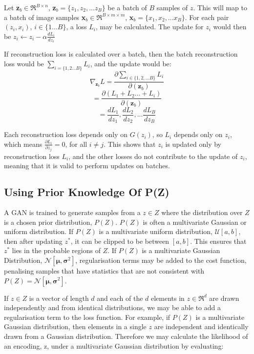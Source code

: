 \documentclass[journal]{IEEEtran}
\begin{document}
Let \textbf{z}$_b \in \Re^{B \times n}$, \textbf{z}$_b=\{z_1, z_2, ... z_B\}$ be a batch of $B$ samples of $z$. This will map to a batch of image samples \textbf{x}$_b \in \Re^{B \times m \times m}$, \textbf{x}$_b=\{x_1, x_2, ... x_B\}$. For each pair $(z_i, x_i)$, $i \in \{1...B\}$, a loss $L_i$, may be calculated. The update for $z_i$ would then be $z_i \gets z_i - \alpha \frac{d L_i}{d z_i}$ 

If reconstruction loss is calculated over a batch, then the batch reconstruction loss would be $\sum_{i=\{1,2...B\}} L_i$, and the update would be: 
\begin{equation}
    \nabla_{\textbf{z}_b} L = \frac{\partial \sum_{i \in \{1,2,...B\}} L_i}{\partial (\textbf{z}_b)}
\end{equation}
\begin{equation}
    =\frac{\partial(L_1+L_2...+L_i)}{\partial(\textbf{z}_b)}
\end{equation}
\begin{equation}
    = \frac{dL_1}{dz_1}, \frac{dL_2}{dz_2}, ... \frac{dL_B}{dz_B}
\end{equation}

Each reconstruction loss depends only on $G(z_i)$, so $L_i$ depends only on $z_i$, which means $\frac{\partial L_i}{\partial z_j}=0$, for all $i\not=j$. This shows that $z_i$ is updated only by reconstruction loss $L_i$, and the other losses do not contribute to the update of $z_i$, meaning that it is valid to perform updates on batches.


\subsection{Using Prior Knowledge Of P(Z)}

A GAN is trained to generate samples from a $z \in Z$ where the distribution over $Z$ is a chosen prior distribution, $P(Z)$. $P(Z)$ is often a multivariate Gaussian or uniform distribution. If $P(Z)$ is a multivariate uniform distribution, $\mathcal{U}[a,b]$, then after updating $z^*$, it can be clipped to be between $[a,b]$. This ensures that $z^*$ lies in the probable regions of $Z$. If $P(Z)$ is a multivariate Gaussian Distribution, $\mathcal{N}[\mathbf{\mu},\mathbf{\sigma}^2]$, regularisation terms may be added to the cost function, penalising samples that have statistics that are not consistent with $P(Z)=\mathcal{N}[\mathbf{\mu},\mathbf{\sigma}^2]$.


If $z \in Z$ is a vector of length $d$ and each of the $d$ elements in $z \in \Re^d$ are drawn independently and from identical distributions, we may be able to add a regularisation term to the loss function. For example, if $P(Z)$ is a multivariate Gaussian distribution, then elements in a single $z$ are independent and identically drawn from a Gaussian distribution. Therefore we may calculate the likelihood of an encoding, z, under a multivariate Gaussian distribution by evaluating:
\end{document}
